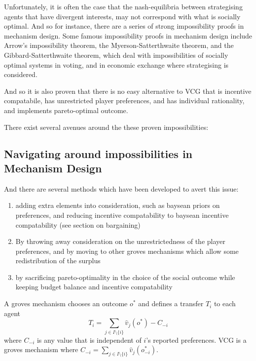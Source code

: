Unfortunately, it is often the case that the nash-equilibria between strategising agents that have divergent interests, may not correspond with what is socially optimal. And so for instance, there are a series of strong impossibility proofs in mechanism design.
Some famous impossibility proofs in mechanism design include Arrow's impossibility theorem, the Myerson-Satterthwaite theorem, and the Gibbard-Satterthwaite theorem, which deal with impossibilities of socially optimal systems in voting, and in economic exchange where strategising is considered.

And so it is also proven that there is no easy alternative to VCG that is incentive compatabile, has unrestricted player preferences, and has individual rationality, and implements pareto-optimal outcome.\cite{YI201679}

There exist several avenues around the these proven impossibilities:

\subsection{Navigating around impossibilities in Mechanism Design}



And there are several methods which have been developed to avert this issue:
\begin{enumerate}
    \item adding extra elements into consideration, such as baysean priors on preferences, and reducing incentive compatability to baysean incentive compatability (see section on bargaining)
    \item By throwing away consideration on the unrestrictedness of the player preferences, and by moving to other groves mechanisms which allow some redistribution of the surplus
    \item by sacrificing pareto-optimality in the choice of the social outcome while keeping budget balance and incentive compatability
\end{enumerate}

A groves mechanism chooses an outcome $o^*$ and defines a transfer $T_i$ to each agent $$T_i=\sum_{j\in I\setminus\{i\}}\hat{v}_j(o^*) - C_{-i}$$
where $C_{-i}$ is any value that is independent of $i$'s reported preferences.
VCG is a groves mechanism where $C_{-i}=\sum_{j\in I\setminus\{i\}}\hat{v}_j(o^*_{-i})$.


